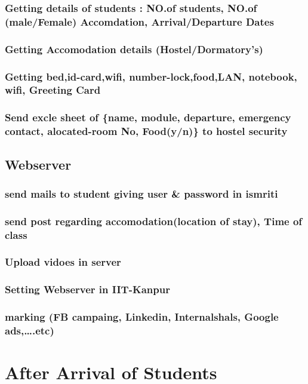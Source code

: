 \documentclass[11pt]{article}
\begin{document}
\subsubsection{Getting details of students : NO.of students, NO.of (male/Female) Accomdation, Arrival/Departure Dates}
\label{sec:orgd5afa67}
\subsubsection{Getting Accomodation details (Hostel/Dormatory's)}
\label{sec:org954b483}
\subsubsection{Getting bed,id-card,wifi, number-lock,food,LAN, notebook, wifi, Greeting Card}
\label{sec:org5258e4f}
\subsubsection{Send excle sheet of \{name, module, departure, emergency contact, alocated-room No, Food(y/n)\} to hostel security}
\label{sec:orgd270ad0}
\subsection{Webserver}
\label{sec:orga6b987e}
\subsubsection{send mails to student giving  user \& password in ismriti}
\label{sec:org1a8515c}
\subsubsection{send post regarding accomodation(location of stay), Time of class}
\label{sec:orgec6e150}
\subsubsection{Upload vidoes in server}
\label{sec:org1318cb4}
\subsubsection{Setting Webserver in IIT-Kanpur}
\label{sec:orgef2d0b1}
\subsubsection{marking (FB campaing, Linkedin, Internalshals, Google ads,\ldots{}.etc)}
\label{sec:org40abd76}
\section{After Arrival of Students}
\label{sec:org1eb5c48}
\end{document}
